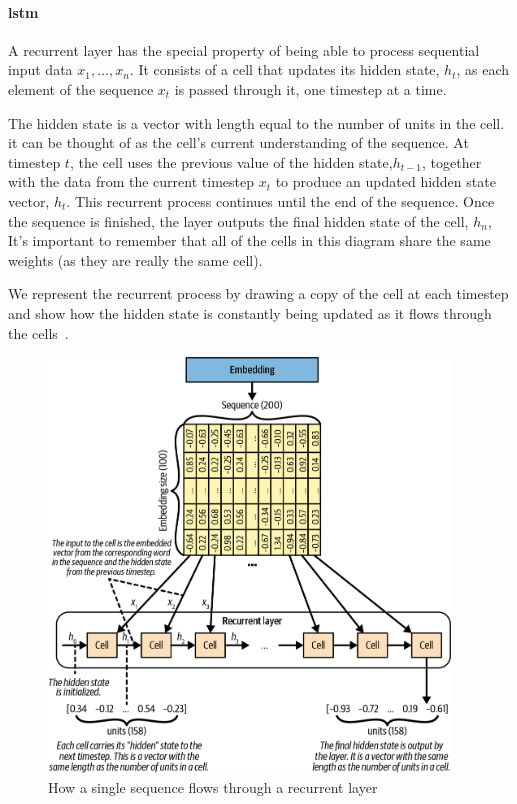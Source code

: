 \paragraph{\gls{lstm}}

A recurrent layer has the special property of being able to process sequential input data \(x_{1}, \ldots , x_{n} \).
It consists of a cell that updates its hidden state, \( h_{t}\), as each element of the sequence \( x_{t} \) is passed through it, one timestep at a time.

The hidden state is a vector with length equal to the number of units in the cell.
it can be thought of as the cell’s current understanding of the sequence.
At timestep \( t \), the cell uses the previous value of the hidden state,\( h_{t-1} \), together with the data from the current timestep \( x_{t} \) to produce an updated hidden state vector, \( h_t\).
This recurrent process continues until the end of the sequence.
Once the sequence is finished, the layer outputs the final hidden state of the cell, \( h_n \),
It’s important to remember that all of the cells in this diagram share the same weights (as they are really the same cell).

We represent the recurrent process by drawing a copy of the cell at each timestep and show how the hidden state is constantly being updated as it flows through the cells~.

\begin{figure}
	\begin{center}
		\includegraphics[width=0.95\textwidth]{figures/recurrent_layer}
	\end{center}
	\caption{How a single sequence flows through a recurrent layer}\label{fig:recurrent_layer}
\end{figure}


